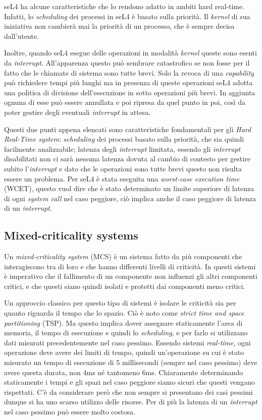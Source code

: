 seL4 ha alcune caratteristiche che lo rendono adatto in ambiti hard real-time. Infatti, lo \textit{scheduling} dei processi in seL4 è basato sulla priorità. Il \textit{kernel} di sua iniziativa non cambierà mai la priorità di un processo, che è sempre decisa dall'utente.

Inoltre, quando seL4 esegue delle operazioni in modalità \textit{kernel} queste sono esenti da \textit{interrupt}. All'apparenza questo può sembrare catastrofico se non fosse per il fatto che le chiamate di sistema sono tutte brevi. Solo la revoca di una \textit{capability} può richiedere tempi più lunghi ma in presenza di queste operazioni seL4 adotta una politica di divisione dell'esecuzione in sotto operazioni più brevi. In aggiunta ognuna di esse può essere annullata e poi ripresa da quel punto in poi, così da poter gestire degli eventuali \textit{interrupt} in attesa.

Questi due punti appena elencati sono caratteristiche fondamentali per gli \textit{Hard Real-Time system}: \textit{scheduling} dei processi basato sulla priorità, che sia quindi facilmente analizzabile; latenza degli \textit{interrupt} limitata, essendo gli \textit{interrupt} disabilitati non ci sarà nessuna latenza dovuta al cambio di contesto per gestire subito l'\textit{interrupt} e dato che le operazioni sono tutte brevi questo non risulta essere un problema.
Per seL4 è stata eseguita una \textit{worst-case execution time} (WCET), questo vuol dire che è stato determinato un limite superiore di latenza di ogni \textit{system call} nel caso peggiore, ciò implica anche il caso peggiore di latenza di un \textit{interrupt}.

\subsection{Mixed-criticality systems}
Un \textit{mixed-criticality system} (MCS) è un sistema fatto da più componenti che interagiscono tra di loro e che hanno differenti livelli di criticità. In questi sistemi è imperativo che il fallimento di un componente non influenzi gli altri componenti critici, e che questi siano quindi isolati e protetti dai componenti meno critici.

Un approccio classico per questo tipo di sistemi è isolare le criticità sia per quanto riguarda il tempo che lo spazio. Ciò è noto come \textit{strict time and space partitioning} (TSP). Ma questo implica dover assegnare staticamente l'area di memoria, il tempo di esecuzione e quindi lo \textit{scheduling}, e per farlo si utilizzano dati misurati precedentemente nel caso pessimo. Essendo sistemi \textit{real-time}, ogni operazione deve avere dei limiti di tempo, quindi un'operazione su cui è stato misurato un tempo di esecuzione di 5 millisecondi (sempre nel caso pessimo) deve avere questa durata, non 4ms né tantomeno 6ms. Chiaramente determinando staticamente i tempi e gli spazi nel caso peggiore siamo sicuri che questi vengano rispettati. C'è da considerare però che non sempre si presentano dei casi pessimi dunque si ha uno scarso utilizzo delle risorse. Per di più la latenza di un \textit{interrupt} nel caso pessimo può essere molto costosa.

